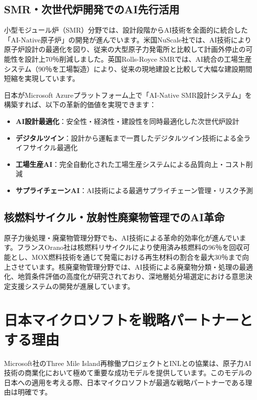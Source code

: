 \documentclass[10pt,a4paper]{jsarticle}
\begin{document}
\subsection{SMR・次世代炉開発でのAI先行活用}

小型モジュール炉（SMR）分野では、設計段階からAI技術を全面的に統合した「AI-Native原子炉」の開発が進んでいます。米国NuScale社では、AI技術により原子炉設計の最適化を図り、従来の大型原子力発電所と比較して計画外停止の可能性を設計上70％削減しました\cite{nuscale2025}。英国Rolls-Royce SMRでは、AI統合の工場生産システム（90％を工場製造）により、従来の現地建設と比較して大幅な建設期間短縮を実現しています\cite{rollsroyce2024}。

日本がMicrosoft Azureプラットフォーム上で「AI-Native SMR設計システム」を構築すれば、以下の革新的価値を実現できます：

\begin{itemize}
    \item \textbf{AI設計最適化}：安全性・経済性・建設性を同時最適化した次世代炉設計
    \item \textbf{デジタルツイン}：設計から運転まで一貫したデジタルツイン技術による全ライフサイクル最適化
    \item \textbf{工場生産AI}：完全自動化された工場生産システムによる品質向上・コスト削減
    \item \textbf{サプライチェーンAI}：AI技術による最適サプライチェーン管理・リスク予測
\end{itemize}

\subsection{核燃料サイクル・放射性廃棄物管理でのAI革命}

原子力後処理・廃棄物管理分野でも、AI技術による革命的効率化が進んでいます。フランスOrano社は核燃料リサイクルにより使用済み核燃料の96％を回収可能とし、MOX燃料技術を通じて発電における再生材料の割合を最大30％まで向上させています\cite{orano2024}。核廃棄物管理分野では、AI技術による廃棄物分類・処理の最適化、地質条件評価の高度化が研究されており\cite{ned2024}、深地層処分場選定における意思決定支援システムの開発が進展しています。

\section{日本マイクロソフトを戦略パートナーとする理由}

Microsoft社のThree Mile Island再稼働プロジェクトとINLとの協業は、原子力AI技術の商業化において極めて重要な成功モデルを提供しています。このモデルの日本への適用を考える際、日本マイクロソフトが最適な戦略パートナーである理由は明確です。
\end{document}
